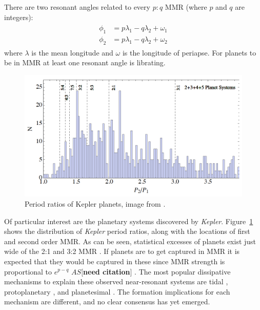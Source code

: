 \documentclass[12pt,letter]{aastex}
\def\memoas#1{\color{red}$AS[${\bf #1}$]$ \color{black}}
\newcommand{\kep}{{\it Kepler}\xspace}
\begin{document}
There are two resonant angles related to every $p:q$ MMR (where $p$ and $q$ are integers):
\begin{align*}
\begin{split}
\phi_1 &= p\lambda_1 - q\lambda_2 + \omega_1 \\
\phi_2 &= p\lambda_1 - q\lambda_2 + \omega_2 
\end{split}
\end{align*}
where $\lambda$ is the mean longitude and $\omega$ is the longitude of periapse. 
For planets to be in MMR at least one resonant angle is librating.



\begin{figure}
\centering
\includegraphics[width=1.00\textwidth]{Figures/KeplerPeriods.png}
\caption{
\footnotesize Period ratios of Kepler planets, image from \citet{Goldreich2014}.}
\label{fig:KepMMR}
\end{figure}

Of particular interest are the planetary systems discovered by \kep.
Figure~\ref{fig:KepMMR} shows the distribution of \kep period ratios, along with the locations of first and second order MMR. 
As can be seen, statistical excesses of planets exist just wide of the 2:1 and 3:2 MMR \citep{Lissauer2011,Fabrycky2014,Steffen2015}.
If planets are to get captured in MMR it is expected that they would be captured in these since MMR strength is proportional to $e^{p-q}$ \memoas{need citation}.
The most popular dissipative mechanisms to explain these observed near-resonant systems are tidal \citep{LithwickWu2012, Batygin2013, Delisle2014},  protoplanetary \citep{Rein2012b, Baruteau2013, Goldreich2014}, and planetesimal \citep{Moore2013, Chatterjee2015}. 
The formation implications for each mechanism are different, and no clear consensus has yet emerged.
\end{document}
